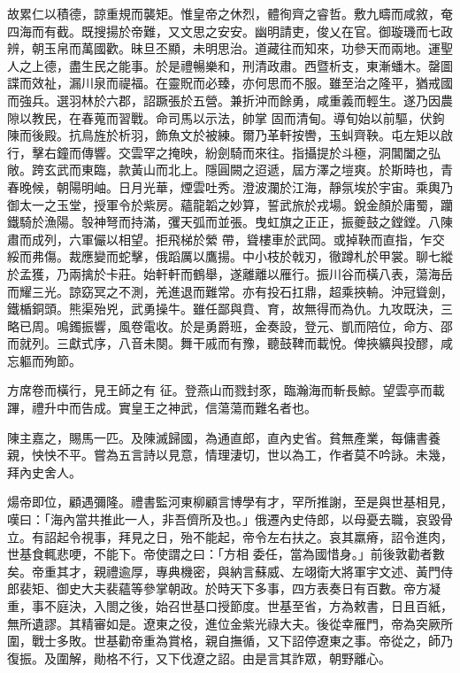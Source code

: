 \begin{pinyinscope}
 故累仁以積德，諒重規而襲矩。惟皇帝之休烈，體徇齊之睿哲。敷九疇而咸敘，奄四海而有截。既搜揚於帝難，又文思之安安。幽明請吏，俊乂在官。御璇璣而七政辨，朝玉帛而萬國歡。昧旦丕顯，未明思治。道藏往而知來，功參天而兩地。運聖人之上德，盡生民之能事。於是禮暢樂和，刑清政肅。西暨析支，東漸蟠木。罄圖諜而效祉，漏川泉而禔福。在靈貺而必臻，亦何思而不服。雖至治之隆平，猶戒國而強兵。選羽林於六郡，詔蹶張於五營。兼折沖而餘勇，咸重義而輕生。遂乃因農隙以教民，在春蒐而習戰。命司馬以示法，帥掌
 固而清甸。導旬始以前驅，伏鉤陳而後殿。抗鳥旌於析羽，飾魚文於被練。爾乃革軒按轡，玉虯齊鞅。屯左矩以啟行，擊右鐘而傳響。交雲罕之掩映，紛劍騎而來往。指攝提於斗極，洞閶闔之弘敞。跨玄武而東臨，款黃山而北上。隱圓闕之迢遞，屆方澤之塏爽。於斯時也，青春晚候，朝陽明岫。日月光華，煙雲吐秀。澄波瀾於江海，靜氛埃於宇宙。乘輿乃御太一之玉堂，授軍令於紫房。蘊龍韜之妙算，誓武旅於戎場。銳金顏於庸蜀，躪鐵騎於漁陽。彀神弩而持滿，彏天弧而並張。曳虹旗之正正，振夔鼓之鏜鏜。八陳肅而成列，六軍儼以相望。拒飛梯於縈
 帶，聳樓車於武岡。或掉鞅而直指，乍交綏而弗傷。裁應變而蛇擊，俄蹈厲以鷹揚。中小枝於戟刃，徹蹲札於甲裳。聊七縱於孟獲，乃兩擒於卡莊。始軒軒而鶴舉，遂離離以雁行。振川谷而橫八表，蕩海岳而耀三光。諒窈冥之不測，羌進退而難常。亦有投石扛鼎，超乘挾輈。沖冠聳劍，鐵楯銅頭。熊渠殆兇，武勇操牛。雖任鄙與賁、育，故無得而為仇。九攻既決，三略已周。鳴鐲振響，風卷電收。於是勇爵班，金奏設，登元、凱而陪位，命方、邵而就列。三獻式序，八音未闋。舞干戚而有豫，聽鼓鞞而載悅。俾挾纊與投醪，咸忘軀而殉節。



 方席卷而橫行，見王師之有
 征。登燕山而戮封豕，臨瀚海而斬長鯨。望雲亭而載蹕，禮升中而告成。實皇王之神武，信蕩蕩而難名者也。



 陳主嘉之，賜馬一匹。及陳滅歸國，為通直郎，直內史省。貧無產業，每傭書養親，怏怏不平。嘗為五言詩以見意，情理淒切，世以為工，作者莫不吟詠。未幾，拜內史舍人。



 煬帝即位，顧遇彌隆。禮書監河東柳顧言博學有才，罕所推謝，至是與世基相見，嘆曰：「海內當共推此一人，非吾儕所及也。」俄遷內史侍郎，以母憂去職，哀毀骨立。有詔起令視事，拜見之日，殆不能起，帝令左右扶之。哀其羸瘠，詔令進肉，世基食輒悲哽，不能下。帝使謂之曰：「方相
 委任，當為國惜身。」前後敦勸者數矣。帝重其才，親禮逾厚，專典機密，與納言蘇威、左翊衛大將軍宇文述、黃門侍郎裴矩、御史大夫裴蘊等參掌朝政。於時天下多事，四方表奏日有百數。帝方凝重，事不庭決，入閤之後，始召世基口授節度。世基至省，方為敕書，日且百紙，無所遺謬。其精審如是。遼東之役，進位金紫光祿大夫。後從幸雁門，帝為突厥所圍，戰士多敗。世基勸帝重為賞格，親自撫循，又下詔停遼東之事。帝從之，師乃復振。及圍解，勛格不行，又下伐遼之詔。由是言其詐眾，朝野離心。




\end{pinyinscope}
